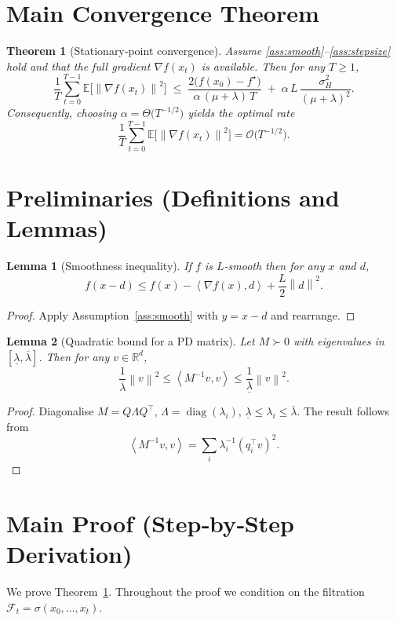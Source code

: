 \documentclass{article}
\newtheorem{theorem}{Theorem}
\newtheorem{lemma}{Lemma}
\newcommand{\E}{\mathbb{E}}
\newcommand{\R}{\mathbb{R}}
\newcommand{\norm}[1]{\left\lVert #1 \right\rVert}
\newcommand{\ip}[2]{\left\langle #1, #2 \right\rangle}
\begin{document}
\section*{Main Convergence Theorem}
\begin{theorem}[Stationary‑point convergence]\label{thm:main}
Assume \ref{ass:smooth}–\ref{ass:stepsize} hold and that the full gradient $\nabla f(x_{t})$ is available. Then for any $T\ge1$,
\[
\frac{1}{T}\sum_{t=0}^{T-1}\E\!\bigl[\norm{\nabla f(x_{t})}^{2}\bigr]
\;\le\;
\frac{2\bigl(f(x_{0})-f^{\star}\bigr)}{\alpha\,(\mu+\lambda)\,T}
\;+\;
\alpha\,L\,\frac{\sigma_{H}^{2}}{(\mu+\lambda)^{2}} .
\tag{1}
\]
Consequently, choosing $\alpha = \Theta\!\bigl(T^{-1/2}\bigr)$ yields the optimal rate
\[
\frac{1}{T}\sum_{t=0}^{T-1}\E\!\bigl[\norm{\nabla f(x_{t})}^{2}\bigr]=\mathcal{O}\!\bigl(T^{-1/2}\bigr).
\]
\end{theorem}

\section*{Preliminaries (Definitions and Lemmas)}
\begin{lemma}[Smoothness inequality]\label{lem:smooth}
If $f$ is $L$‑smooth then for any $x$ and $d$,
\[
f(x-d)\le f(x)-\ip{\nabla f(x)}{d}+\frac{L}{2}\norm{d}^{2}.
\]
\end{lemma}
\begin{proof}
Apply Assumption~\ref{ass:smooth} with $y=x-d$ and rearrange. \hfill\qedsymbol
\end{proof}

\begin{lemma}[Quadratic bound for a PD matrix]\label{lem:newton}
Let $M\succ0$ with eigenvalues in $[\underline\lambda,\overline\lambda]$. Then for any $v\in\R^{d}$,
\[
\frac{1}{\overline\lambda}\norm{v}^{2}\le \ip{M^{-1}v}{v}\le\frac{1}{\underline\lambda}\norm{v}^{2}.
\]
\end{lemma}
\begin{proof}
Diagonalise $M=Q\Lambda Q^{\top}$, $\Lambda=\operatorname{diag}(\lambda_{i})$, $\underline\lambda\le\lambda_{i}\le\overline\lambda$.  The result follows from
\[
\ip{M^{-1}v}{v}= \sum_{i}\lambda_{i}^{-1}(q_{i}^{\top}v)^{2}.
\] 
\hfill\qedsymbol
\end{proof}

\section*{Main Proof (Step‑by‑Step Derivation)}
We prove Theorem~\ref{thm:main}. Throughout the proof we condition on the filtration
$\mathcal{F}_{t}=\sigma(x_{0},\dots,x_{t})$.
\end{document}
